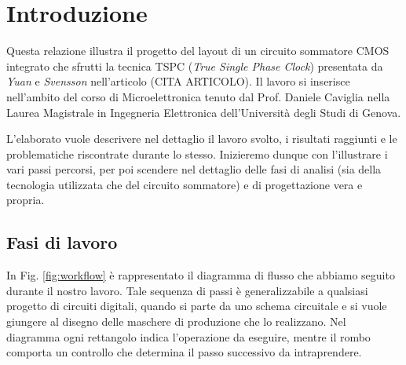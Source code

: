 
\chapter{Introduzione} %
\label{Chapter1} 


Questa relazione illustra il progetto del layout di un circuito sommatore CMOS integrato che sfrutti la tecnica TSPC (\textit{True Single Phase Clock}) presentata da \textit{Yuan} e \textit{Svensson} nell'articolo (CITA ARTICOLO). Il lavoro si inserisce nell'ambito del corso di Microelettronica tenuto dal Prof. Daniele Caviglia nella Laurea Magistrale in Ingegneria Elettronica dell'Università degli Studi di Genova.

L'elaborato vuole descrivere nel dettaglio il lavoro svolto, i risultati raggiunti e le problematiche riscontrate durante lo stesso. Inizieremo dunque con l'illustrare i vari passi percorsi, per poi scendere nel dettaglio delle fasi di analisi (sia della tecnologia utilizzata che del circuito sommatore) e di progettazione vera e propria.

\section{Fasi di lavoro}
\label{sec:sec_fasiLavoro}

In Fig. \ref{fig:workflow} è rappresentato il diagramma di flusso che abbiamo seguito durante il nostro lavoro. Tale sequenza di passi è generalizzabile a qualsiasi progetto di circuiti digitali, quando si parte da uno schema circuitale e si vuole giungere al disegno delle maschere di produzione che lo realizzano. Nel diagramma ogni rettangolo indica l'operazione da eseguire, mentre il rombo comporta un controllo che determina il passo successivo da intraprendere. 

